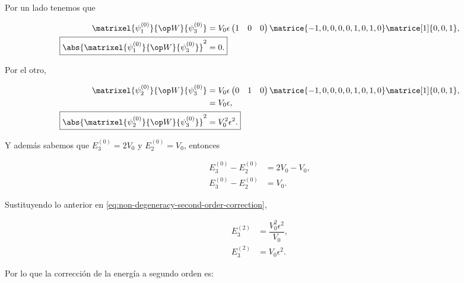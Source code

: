 \documentclass[./../main.tex]{subfiles}
\begin{document}
\begin{exercise}
\begin{enumerate}[label=(\alph*)]
\begin{solution}
                Por un lado tenemos que

                \begin{align*}
                    \matrixel{\psi_{1}^{(0)}}{\observable{W}}{\psi_{3}^{(0)}} &= V_{0} \epsilon \begin{pmatrix}
                        1 & 0 & 0
                    \end{pmatrix}\matrice{-1, 0, 0, 0, 0, 1, 0, 1, 0}\matrice[1]{0, 0, 1},\\
                    \Aboxed{\abs{\matrixel{\psi_{1}^{(0)}}{\observable{W}}{\psi_{3}^{(0)}}}^{2} &= 0.}
                \end{align*}

                Por el otro,

                \begin{align*}
                    \matrixel{\psi_{2}^{(0)}}{\observable{W}}{\psi_{3}^{(0)}} &= V_{0} \epsilon \begin{pmatrix}
                        0 & 1 & 0
                    \end{pmatrix}\matrice{-1, 0, 0, 0, 0, 1, 0, 1, 0}\matrice[1]{0, 0, 1},\\
                    &= V_{0} \epsilon,\\
                    \Aboxed{\abs{\matrixel{\psi_{2}^{(0)}}{\observable{W}}{\psi_{3}^{(0)}}}^{2} &= V_{0}^{2} \epsilon^{2}.}
                \end{align*}

                Y además sabemos que \(E_{3}^{(0)} = 2V_{0}\) y \(E_{2}^{(0)} = V_{0}\), entonces

                \begin{align*}
                    E_{3}^{(0)} - E_{2}^{(0)} &= 2V_{0} - V_{0},\\
                    E_{3}^{(0)} - E_{2}^{(0)} &= V_{0}.
                \end{align*}

                Sustituyendo lo anterior en \cref{eq:non-degeneracy-second-order-correction},

                \begin{align*}
                    E_{3}^{(2)} &= \dfrac{V_{0}^{2} \epsilon^{2}}{V_{0}},\\
                    E_{3}^{(2)} &= V_{0} \epsilon^{2}.
                \end{align*}

                Por lo que la corrección de la energía a segundo orden es:
                

\end{solution}
\end{enumerate}
\end{exercise}
\end{document}
